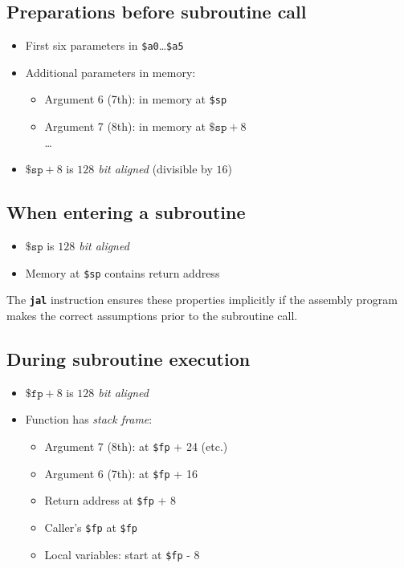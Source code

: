 \documentclass{article}
\newcommand{\insn}[1]{\texttt{\textbf{\textcolor{dblue}{#1}}}}
\begin{document}
\subsection{Preparations before subroutine call}
  \begin{itemize}
    \item First six parameters in \texttt{\$a0}\ldots\texttt{\$a5}
    \item Additional parameters in memory:
      \begin{itemize}
        \item Argument 6 (7th): in memory at \texttt{\$sp}
        \item Argument 7 (8th): in memory at $\texttt{\$sp} + 8$\\
          \ldots
      \end{itemize}
    \item $\texttt{\$sp} + 8$ is \emph{$128$ bit aligned} (divisible by $16$)
  \end{itemize}

\subsection{When entering a subroutine}
    \begin{itemize}
    \item $\texttt{\$sp}$ is \emph{$128$ bit aligned}
    \item Memory at \texttt{\$sp} contains return address
    \end{itemize}

    The \insn{jal} instruction ensures these properties implicitly if the assembly
    program makes the correct assumptions prior to the subroutine call.

\subsection{During subroutine execution}
    \begin{itemize}
    \item $\texttt{\$fp} + 8$ is \emph{$128$ bit aligned}
    \item Function has \emph{stack frame}:
      \begin{itemize}
        \item Argument 7 (8th): at \texttt{\$fp} + 24 (etc.)
        \item Argument 6 (7th): at \texttt{\$fp} + 16
        \item Return address at \texttt{\$fp} + 8
        \item Caller's \texttt{\$fp} at \texttt{\$fp}
        \item Local variables: start at \texttt{\$fp} - 8
      \end{itemize}
    \end{itemize}
\end{document}
